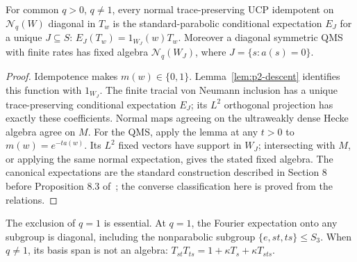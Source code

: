 \begin{theorem}\label{thm:p2-projections}
For common $q>0$, $q\ne1$, every normal trace-preserving UCP idempotent
on $\mathcal N_q(W)$ diagonal in $T_w$ is the standard-parabolic
conditional expectation $E_J$ for a unique $J\subseteq S$:
$E_J(T_w)=1_{W_J}(w)T_w$.
Moreover a diagonal symmetric QMS with finite rates has fixed algebra
$\mathcal N_q(W_J)$, where $J=\{s:a(s)=0\}$.
\end{theorem}
\begin{proof}
Idempotence makes $m(w)\in\{0,1\}$. Lemma~\ref{lem:p2-descent} identifies
this function with $1_{W_J}$. The finite tracial von Neumann inclusion
has a unique trace-preserving conditional expectation $E_J$; its $L^2$
orthogonal projection has exactly these coefficients. Normal maps agreeing
on the ultraweakly dense Hecke algebra agree on $M$.
For the QMS, apply the lemma at any $t>0$ to $m(w)=e^{-ta(w)}$.
Its $L^2$ fixed vectors have support in $W_J$; intersecting with $M$,
or applying the same normal expectation, gives the stated fixed algebra.
The canonical expectations are the standard construction described in
Section 8 before Proposition 8.3 of~\cite{CaspersEtAl2023}; the converse
classification here is proved from the relations.
\end{proof}

The exclusion of $q=1$ is essential. At $q=1$, the Fourier expectation
onto any subgroup is diagonal, including the nonparabolic subgroup
$\{e,st,ts\}\leq S_3$. When $q\ne1$, its basis span is not an algebra:
$T_{st}T_{ts}=1+\kappa T_s+\kappa T_{sts}$.

